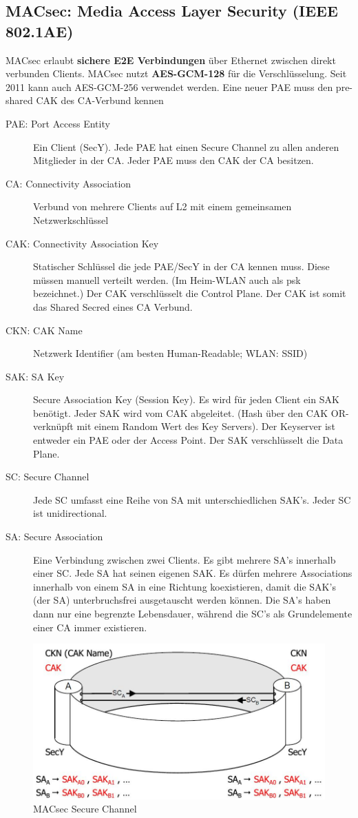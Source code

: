 \subsection{MACsec: Media Access Layer Security (IEEE 802.1AE)}\label{sec:macsec-media-access-layer-security-ieee-8021ae}
MACsec erlaubt \textbf{sichere E2E Verbindungen} über Ethernet zwischen direkt verbunden Clients. MACsec nutzt \textbf{AES-GCM-128} für die Verschlüsselung. Seit 2011 kann auch AES-GCM-256 verwendet werden. Eine neuer PAE muss den pre-shared CAK des CA-Verbund kennen
\begin{description}
	\item[PAE: Port Access Entity] Ein Client (SecY). Jede PAE hat einen Secure Channel zu allen anderen Mitglieder in der CA. Jeder PAE muss den CAK der CA besitzen.
	\item[CA: Connectivity Association] Verbund von mehrere Clients auf L2 mit einem gemeinsamen Netzwerkschlüssel
	\item[CAK: Connectivity Association Key] Statischer Schlüssel die jede PAE/SecY in der CA kennen muss. Diese müssen manuell verteilt werden. (Im Heim-WLAN auch als \gls{psk} bezeichnet.) Der CAK verschlüsselt die Control Plane. Der CAK ist somit das Shared Secred eines CA Verbund.
	\item[CKN: CAK Name] Netzwerk Identifier (am besten Human-Readable; WLAN: SSID)
	\item[SAK: SA Key] Secure Association Key (Session Key). Es wird für jeden Client ein SAK benötigt. Jeder SAK wird vom CAK abgeleitet. (Hash über den CAK OR-verknüpft mit einem Random Wert des Key Servers). Der Keyserver ist entweder ein PAE oder der Access Point. Der SAK verschlüsselt die Data Plane.
	\item[SC: Secure Channel] Jede SC umfasst eine Reihe von SA mit unterschiedlichen SAK's. Jeder SC ist unidirectional. 
	\item[SA: Secure Association] Eine Verbindung zwischen zwei Clients. Es gibt mehrere SA's innerhalb einer SC. Jede SA hat seinen eigenen SAK. Es dürfen mehrere Associations innerhalb von einem SA in eine Richtung koexistieren, damit die SAK's (der SA) unterbruchsfrei ausgetauscht werden können.  Die SA's haben dann nur eine begrenzte Lebensdauer, während die SC's als Grundelemente einer CA immer existieren. 
\end{description}

\begin{figure}[h]
	\centering
	\includegraphics[width=0.6\linewidth]{images/macsec_sc_sa}
	\caption{MACsec Secure Channel}
	\label{fig:macsecscsa}
\end{figure}


